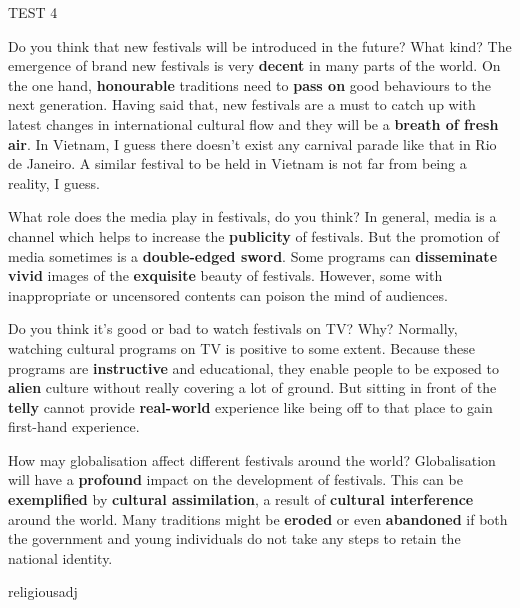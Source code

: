 \begin{glossarymc}[Cambridge 5]
\begin{test}{TEST 4}
    \begin{qa}{Do you think that new festivals will be introduced in the future? What kind?}
    The emergence of brand new festivals is very \textbf{decent} in many parts of the world. On the one hand, \textbf{honourable} traditions need to \textbf{pass on} good behaviours to the next generation. Having said that, new festivals are a must to catch up with latest changes in international cultural flow and they will be a \textbf{breath of fresh air}. In Vietnam, I guess there doesn’t exist any carnival parade like that in Rio de Janeiro. A similar festival to be held in Vietnam is not far from being a reality, I guess.
    \end{qa}

    \begin{qa}{What role does the media play in festivals, do you think?}
    In general, media is a channel which helps to increase the \textbf{publicity} of festivals. But the promotion of media sometimes is a \textbf{double-edged sword}. Some programs can \textbf{disseminate} \textbf{vivid} images of the \textbf{exquisite} beauty of festivals. However, some with inappropriate or uncensored contents can poison the mind of audiences.
    \end{qa}

    \begin{qa}{Do you think it's good or bad to watch festivals on TV? Why?}
    Normally, watching cultural programs on TV is positive to some extent. Because these programs are \textbf{instructive} and educational, they enable people to be exposed to \textbf{alien} culture without really covering a lot of ground. But sitting in front of the \textbf{telly} cannot provide \textbf{real-world} experience like being off to that place to gain first-hand experience.
    \end{qa}

    \begin{qa}{How may globalisation affect different festivals around the world?}
    Globalisation will have a \textbf{profound} impact on the development of festivals. This can be \textbf{exemplified} by \textbf{cultural assimilation}, a result of \textbf{cultural interference} around the world. Many traditions might be \textbf{eroded} or even \textbf{abandoned} if both the government and young individuals do not take any steps to retain the national identity.
    \end{qa}

        \begin{VocabExplain}[Part 3]
            \begin{ExplainCard}{religious}{adj}
            \end{ExplainCard}


\end{VocabExplain}
\end{test}
\end{glossarymc}
